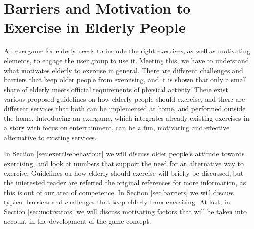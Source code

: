 \chapter{Barriers and Motivation to Exercise in Elderly People  }
\label{chap:olderexercise}

An exergame for elderly needs to include the right exercises, as well as motivating elements, to engage the user group to use it. Meeting this, we have to understand what motivates elderly to exercise in general. There are different challenges and barriers that keep older people from exercising, and it is shown that only a small share of elderly meets official requirements of physical activity. There exist various proposed guidelines on how elderly people should exercise, and there are different services that both can be implemented at home, and performed outside the home. Introducing an exergame, which integrates already existing exercises in a story with focus on entertainment, can be a fun, motivating and effective alternative to existing services.  

In Section \ref{sec:exercisebehaviour} we will discuss older people's attitude towards exercising, and look at numbers that support the need for an alternative way to exercise. Guidelines on how elderly should exercise will briefly be discussed, but the interested reader are referred the original references for more information, as this is out of our area of competence. In Section \ref{sec:barriers} we will discuss typical barriers and challenges that keep elderly from exercising. At last, in Section \ref{sec:motivators} we will discuss motivating factors that will be taken into account in the development of the game concept.  

